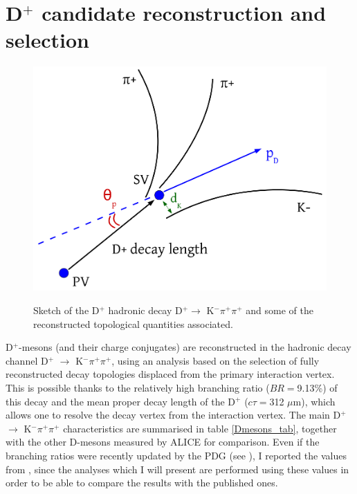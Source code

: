 \documentclass[b5paper,10pt,twoside,oldstyle,classica]{toptesi}
\begin{document}
\section{D$^+$ candidate reconstruction and selection}
\begin{figure}[tb]
\begin{center}
{\includegraphics[scale = 0.25]{Dplus_sketch.png}}
\caption{Sketch of the D$^+$ hadronic decay D$^+ \rightarrow$ K$^-\pi^+\pi^+$ and some of the reconstructed topological quantities associated.}
\label{Dplus_sketch}
\end{center}
\end{figure}
D$^+$-mesons (and their charge conjugates) are reconstructed in the hadronic decay channel D$^+$ $\rightarrow$ K$^{-} \pi^+ \pi^+$, using an analysis based on the selection of fully reconstructed decay topologies displaced from the primary interaction vertex. This is possible thanks to the relatively high branching ratio ($BR=$9.13\%) of this decay and the mean proper decay length of the D$^+$ ($c\tau=$312 $\mu$m), which allows one to resolve the decay vertex from the interaction vertex. The main D$^+$ $\rightarrow$ K$^{-} \pi^+ \pi^+$ characteristics are summarised in table \ref{Dmesons_tab}, together with the other D-mesons measured by ALICE for comparison. Even if the branching ratios were recently updated by the PDG (see \cite{Agashe:2015up}), I reported the values from \cite{Agashe:2014kda}, since the analyses which I will present are performed using these values in order to be able to compare the results with the published ones.
\end{document}

